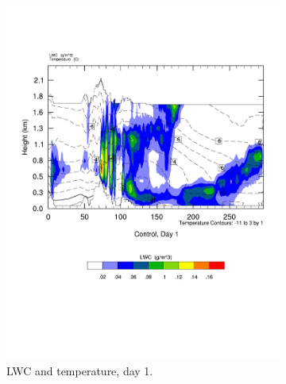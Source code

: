 \begin{figure}
    \centering
    \begin{subfigure}{0.48\textwidth}
        \centering
        \includegraphics[width=\textwidth]{results/control/crossSec_LWC_Control_Day1.pdf}
        \caption{LWC and temperature, day 1.}
        \label{subfig:cross_LWC_day1}
    \end{subfigure}
    \begin{subfigure}{0.48\textwidth}
        \centering

\end{subfigure}
\end{figure}
